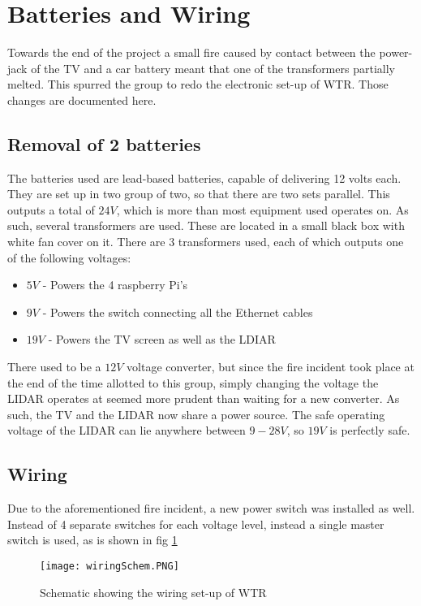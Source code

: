 \section{Batteries and Wiring}
Towards the end of the project a small fire caused by contact between the power-jack of the TV and a car battery meant that one of the transformers partially melted.
This spurred the group to redo the electronic set-up of WTR.
Those changes are documented here.

\subsection{Removal of 2 batteries}
The batteries used are lead-based batteries, capable of delivering 12 volts each.
They are set up in two group of two, so that there are two sets parallel.
This outputs a total of $24V$, which is more than most equipment used operates on.
As such, several transformers are used.
These are located in a small black box with white fan cover on it.
There are 3 transformers used, each of which outputs one of the following voltages:
\begin{itemize}
\item $5V$ - Powers the 4 raspberry Pi's
\item $9V$ - Powers the switch connecting all the Ethernet cables
\item $19V$ - Powers the TV screen as well as the LDIAR
\end{itemize}

There used to be a $12V$ voltage converter, but since the fire incident took place at the end of the time allotted to this group, simply changing the voltage the LIDAR operates at seemed more prudent than waiting for a new converter.
As such, the TV and the LIDAR now share a power source.
The safe operating voltage of the LIDAR can lie anywhere between $9-28V$, so $19V$ is perfectly safe.


\subsection{Wiring}
Due to the aforementioned fire incident, a new power switch was installed as well.
Instead of 4 separate switches for each voltage level, instead a single master switch is used, as is shown in fig \ref{fig::wiringschem}

\begin{figure}
\centering
\texttt{[image: wiringSchem.PNG]}
\caption{Schematic showing the wiring set-up of WTR}
\label{fig::wiringschem}
\end{figure}

